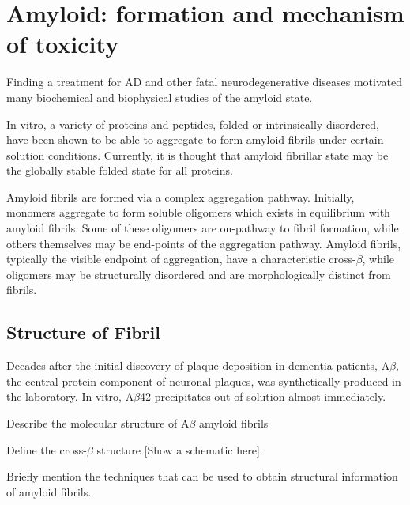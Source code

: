 \section{Amyloid: formation and mechanism of toxicity}
  \begin{outline}[enumerate]
    \1 Finding a treatment for AD and other fatal neurodegenerative diseases motivated many biochemical and biophysical studies of the amyloid state.  
    
    \1 In vitro, a variety of proteins and peptides, folded or intrinsically disordered, have been shown to be able to aggregate to form amyloid fibrils under certain solution conditions. Currently, it is thought that amyloid fibrillar state may be the globally stable folded state for all proteins.

    \1 Amyloid fibrils are formed via a complex aggregation pathway. Initially, monomers aggregate to form soluble oligomers which exists in equilibrium with amyloid fibrils. Some of these oligomers are on-pathway to fibril formation, while others themselves may be end-points of the aggregation pathway. Amyloid fibrils, typically the visible endpoint of aggregation, have a characteristic cross-$\beta$, while oligomers may be structurally disordered and are morphologically distinct from fibrils.
  \end{outline}

 \subsection{Structure of Fibril}
   \begin{outline}
    \1 Decades after the initial discovery of plaque deposition in dementia patients, A$\beta$, the central protein component of neuronal plaques, was synthetically produced in the laboratory. In vitro, A$\beta$42 precipitates out of solution almost immediately.
    
  		\2 Describe the molecular structure of A$\beta$ amyloid fibrils
  	
  			\3 Define the cross-$\beta$ structure [Show a schematic here].
  	
  		\2 Briefly mention the techniques that can be used to obtain structural information of amyloid fibrils.
		\end{outline}

